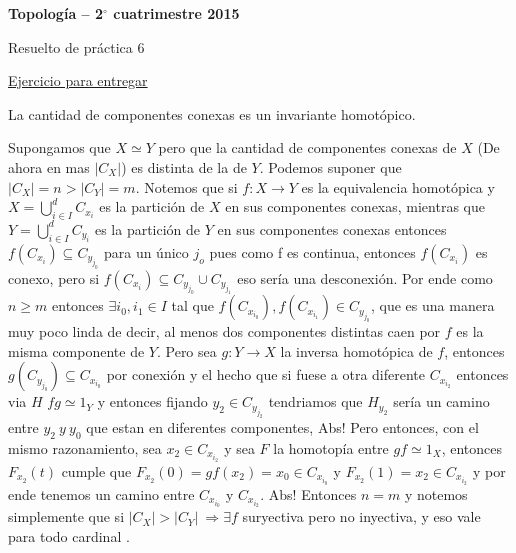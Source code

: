\documentclass[11pt]{article}
\newenvironment{proof}[1][Demostraci\'on]{\begin{trivlist}
\item[\hskip \labelsep {\bfseries #1}]}{\end{trivlist}}
\begin{document}
\pagestyle{empty}
\pagestyle{fancy}
\fancyfoot[CO]{\slshape \thepage}
\renewcommand{\headrulewidth}{0pt}


\centerline{\bf Topolog\'ia -- 2$^\circ$
cuatrimestre 2015}
\centerline{\sc Resuelto de pr\'actica 6}

\bigskip

\begin{itemize}

\item {\underline{Ejercicio para entregar}}

\item La cantidad de componentes conexas es un invariante homot\'opico.

\begin{proof}

Supongamos que $X \simeq Y$ pero que la cantidad de componentes conexas de $X$ (De ahora en mas $|C_X|$) es distinta de la de $Y$. Podemos suponer que $|C_X|=n > |C_Y|=m$. Notemos que si $f: X \rightarrow Y$ es la equivalencia homot\'opica y $X=\bigcup_{i \in I}^{d}{C_{x_i}}$ es la partici\'on de $X$ en sus componentes conexas, mientras que $Y=\bigcup_{i \in I}^{d}{C_{y_i}}$ es la partici\'on de $Y$ en sus componentes conexas  entonces $f(C_{x_i}) \subseteq C_{y_{j_0}}$ para un \'unico $j_o$ pues como f es continua, entonces $f(C_{x_i})$ es conexo, pero si $f(C_{x_i})\subseteq C_{y_{j_0}} \cup C_{y_{j_1}}$ eso ser\'ia una desconexi\'on. Por ende como $n \geq m $ entonces  $\exists i_0 , i_1 \in I$ tal que $f(C_{x_{i_0}}),f(C_{x_{i_1}}) \in C_{y_{j_0}}$, que es una manera muy poco linda de decir, al menos dos componentes distintas caen por $f$ es la misma componente de $Y$. Pero sea $g: Y \rightarrow X$ la inversa homot\'opica de $f$, entonces $g(C_{y_{j_0}}) \subseteq C_{x_{i_0}}$ por conexi\'on y el hecho que si fuese a otra diferente $C_{x_{i_2}}$ entonces via $H$  $fg \simeq 1_Y$ y entonces fijando $y_2 \in C_{y_{j_2}}$ tendriamos que $H_{y_2}$ ser\'ia un camino entre $y_2 \ y \ y_0$ que estan en diferentes componentes, Abs! Pero entonces, con el mismo razonamiento, sea $x_2 \in C_{x_{i_2}}$ y sea $F$ la homotop\'ia entre $gf \simeq 1_X$, entonces $F_{x_2}(t)$ cumple que $F_{x_2}(0)=gf (x_2)=x_0 \in C_{x_{i_0}}$ y $F_{x_2}(1)=x_2 \in C_{x_{i_2}}$ y por ende tenemos un camino entre $C_{x_{i_0}}$ y $C_{x_{i_2}}$. Abs! Entonces $n=m$ y notemos simplemente que si $|C_X|>|C_Y| \ \Longrightarrow \exists f$ suryectiva pero no inyectiva, y eso vale para todo cardinal .

\end{proof}

\end{itemize}
\end{document}
